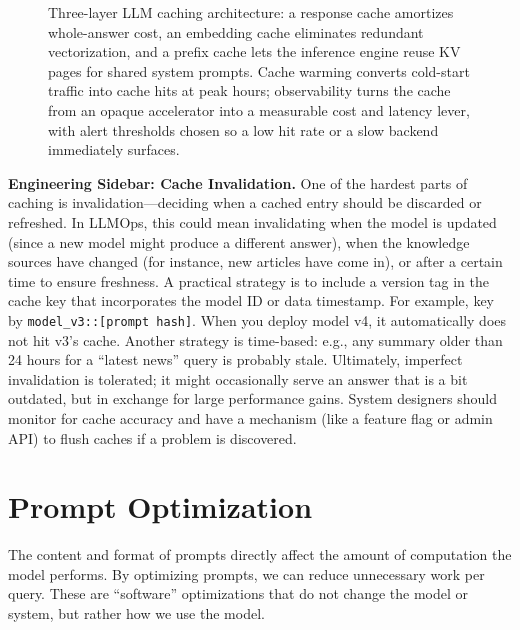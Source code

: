 \begin{figure}[t]
\begin{llmfigbox}
\end{llmfigbox}
\caption{Three-layer LLM caching architecture: a response cache amortizes whole-answer cost, an embedding cache eliminates redundant vectorization, and a prefix cache lets the inference engine reuse KV pages for shared system prompts. Cache warming converts cold-start traffic into cache hits at peak hours; observability turns the cache from an opaque accelerator into a measurable cost and latency lever, with alert thresholds chosen so a low hit rate or a slow backend immediately surfaces.}
\label{fig:ch07_caching_callout}
\end{figure}

\noindent \textbf{Engineering Sidebar: Cache Invalidation.}
One of the hardest parts of caching is invalidation---deciding when a cached entry should be discarded or refreshed. In LLMOps, this could mean invalidating when the model is updated (since a new model might produce a different answer), when the knowledge sources have changed (for instance, new articles have come in), or after a certain time to ensure freshness. A practical strategy is to include a version tag in the cache key that incorporates the model ID or data timestamp. For example, key by \verb|model_v3::[prompt hash]|. When you deploy model v4, it automatically does not hit v3’s cache. Another strategy is time-based: e.g., any summary older than 24 hours for a ``latest news'' query is probably stale. Ultimately, imperfect invalidation is tolerated; it might occasionally serve an answer that is a bit outdated, but in exchange for large performance gains. System designers should monitor for cache accuracy and have a mechanism (like a feature flag or admin API) to flush caches if a problem is discovered.

\FloatBarrier
\section{Prompt Optimization}
\label{sec:perf-prompt}
The content and format of prompts directly affect the amount of computation the model performs. By optimizing prompts, we can reduce unnecessary work per query. These are “software” optimizations that do not change the model or system, but rather how we use the model.

